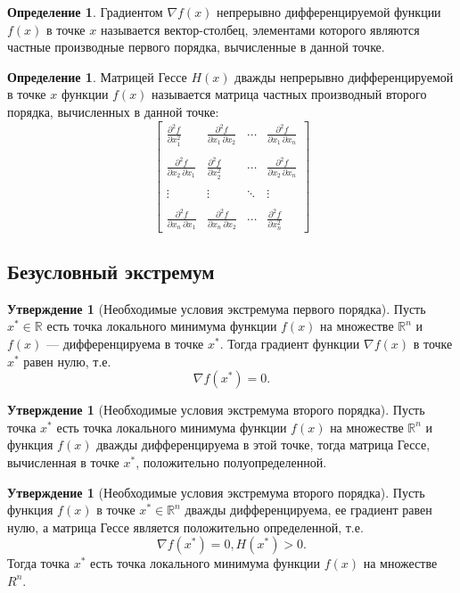 \documentclass[12pt]{report}
\theoremstyle{definition}
\newtheorem{definition}[theorem]{Определение}
\newtheorem{statement}[theorem]{Утверждение}
\newcommand{\R}{\mathbb R}
\begin{document}
\begin{definition}
Градиентом $\nabla f(x)$ непрерывно дифференцируемой функции $f(x)$ в точке
$x$ называется вектор-столбец, элементами которого являются частные производные
первого порядка, вычисленные в данной точке.
\end{definition}

\begin{definition}
Матрицей Гессе $H(x)$ дважды непрерывно дифференцируемой в точке $x$ функции
$f(x)$ называется матрица частных производный второго порядка, вычисленных
в данной точке:
$$
\begin{bmatrix}
\frac{\partial^2 f}{\partial x_1^2} & \frac{\partial^2 f}{\partial x_1\,\partial x_2} & \cdots & \frac{\partial^2 f}{\partial x_1\,\partial x_n} \\  \\
\frac{\partial^2 f}{\partial x_2\,\partial x_1} & \frac{\partial^2 f}{\partial x_2^2} & \cdots & \frac{\partial^2 f}{\partial x_2\,\partial x_n} \\  \\
\vdots & \vdots & \ddots & \vdots \\  \\
\frac{\partial^2 f}{\partial x_n\,\partial x_1} & \frac{\partial^2 f}{\partial x_n\,\partial x_2} & \cdots & \frac{\partial^2 f}{\partial x_n^2}
\end{bmatrix}
$$
\end{definition}

\subsection{Безусловный экстремум}
\begin{statement}[Необходимые условия экстремума первого порядка]
Пусть $x^* \in \R$ есть точка локального минимума функции $f(x)$
на множестве $\R^n$ и $f(x)$ --- дифференцируема в точке $x^*$.
Тогда градиент функции $\nabla f(x)$ в точке $x^*$ равен нулю, т.е.
$$
\nabla f(x^*) = 0.
$$
\end{statement}

\begin{statement}[Необходимые условия экстремума второго порядка]
Пусть точка $x^*$ есть точка локального минимума функции $f(x)$
на множестве $\R^n$ и функция $f(x)$ дважды дифференцируема в этой точке,
тогда матрица Гессе, вычисленная в точке $x^*$, положительно полуопределенной.
\end{statement}

\begin{statement}[Необходимые условия экстремума второго порядка]
Пусть функция $f(x)$ в точке $x^* \in \R^n$ дважды дифференцируема,
ее градиент равен нулю, а матрица Гессе является положительно определенной,
т.е.
$$
\nabla f(x^*) = 0, H(x^*) > 0.
$$
Тогда точка $x^*$ есть точка локального минимума функции $f(x)$ на множестве
$R^n$.
\end{statement}
\end{document}
